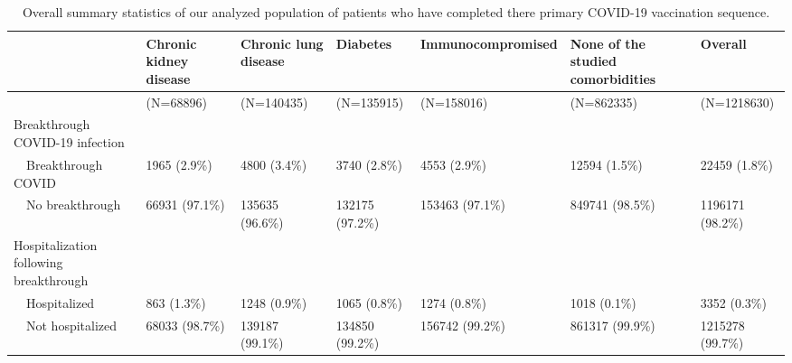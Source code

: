 \begin{table}[!htbp]
\centering
\begin{tabular}{lllllll}
  \hline
  & Chronic kidney disease & Chronic lung disease & Diabetes & Immunocompromised & None of the studied comorbidities & Overall \\ 
  \hline
 & (N=68896) & (N=140435) & (N=135915) & (N=158016) & (N=862335) & (N=1218630) \\ 
  Breakthrough COVID-19 infection &  &  &  &  &  &  \\ 
    Breakthrough COVID & 1965 (2.9\%) & 4800 (3.4\%) & 3740 (2.8\%) & 4553 (2.9\%) & 12594 (1.5\%) & 22459 (1.8\%) \\ 
    No breakthrough & 66931 (97.1\%) & 135635 (96.6\%) & 132175 (97.2\%) & 153463 (97.1\%) & 849741 (98.5\%) & 1196171 (98.2\%) \\ 
  Hospitalization following breakthrough &  &  &  &  &  &  \\ 
    Hospitalized & 863 (1.3\%) & 1248 (0.9\%) & 1065 (0.8\%) & 1274 (0.8\%) & 1018 (0.1\%) & 3352 (0.3\%) \\ 
    Not hospitalized & 68033 (98.7\%) & 139187 (99.1\%) & 134850 (99.2\%) & 156742 (99.2\%) & 861317 (99.9\%) & 1215278 (99.7\%) \\ 
   \hline
\end{tabular}
\caption{Overall summary statistics of our analyzed population of patients who have completed there primary COVID-19 vaccination sequence.} 
\label{tab:table_1_short}
\end{table}
